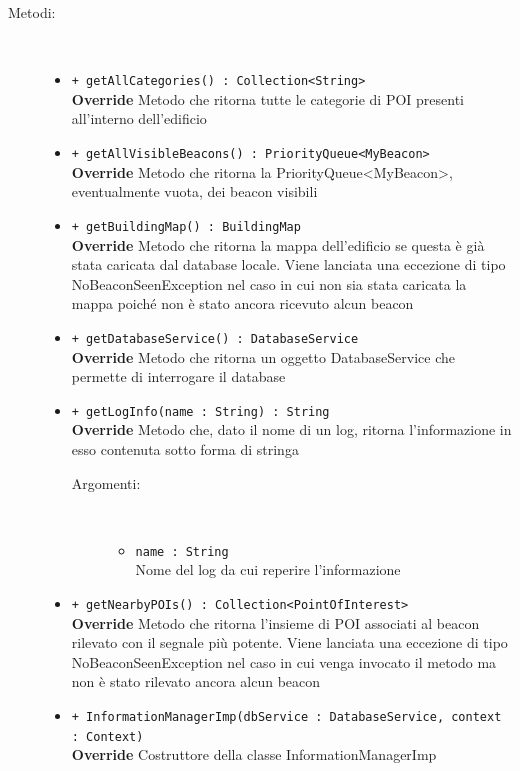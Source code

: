 \documentclass[../DefinizioneDiProdotto.tex]{subfiles}
\begin{document}
\begin{description}
\begin{itemize}
\end{itemize}
\item[Metodi:] \
\begin{itemize}
\item \texttt{+ getAllCategories() : Collection<String>}\\
\textbf{Override} Metodo che ritorna tutte le categorie di POI presenti all'interno dell'edificio
 \item \texttt{+ getAllVisibleBeacons() : PriorityQueue<MyBeacon>}\\
\textbf{Override} Metodo che ritorna la PriorityQueue<MyBeacon>, eventualmente vuota, dei beacon visibili
 \item \texttt{+ getBuildingMap() : BuildingMap}\\
\textbf{Override} Metodo che ritorna la mappa dell'edificio se questa è già stata caricata dal database locale. Viene lanciata una eccezione di tipo NoBeaconSeenException nel caso in cui non sia stata caricata la mappa poiché non è stato ancora ricevuto alcun beacon
 \item \texttt{+ getDatabaseService() : DatabaseService}\\
\textbf{Override} Metodo che ritorna un oggetto DatabaseService che permette di interrogare il database
 \item \texttt{+ getLogInfo(name : String) : String}\\
\textbf{Override} Metodo che, dato il nome di un log, ritorna l'informazione in esso contenuta sotto forma di stringa
 \begin{description}
\item[Argomenti:] \
\begin{itemize}
\item \texttt{name : String}\\
Nome del log da cui reperire l'informazione\end{itemize}
\end{description}
\item \texttt{+ getNearbyPOIs() : Collection<PointOfInterest>}\\
\textbf{Override} Metodo che ritorna l'insieme di POI associati al beacon rilevato con il segnale più potente. Viene lanciata una eccezione di tipo NoBeaconSeenException nel caso in cui venga invocato il metodo ma non è stato rilevato ancora alcun beacon
 \item \texttt{+ InformationManagerImp(dbService : DatabaseService, context : Context)}\\
\textbf{Override} Costruttore della classe InformationManagerImp

\end{itemize}
\end{description}
\end{document}

